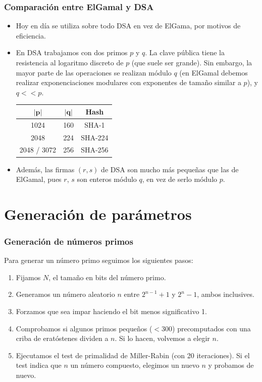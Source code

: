 \documentclass{beamer}
\begin{document}
\begin{frame}
    \frametitle{Comparación entre ElGamal y DSA}

    \begin{itemize}
        \item Hoy en día se utiliza sobre todo DSA en vez de ElGama, por motivos de eficiencia.
        \item En DSA trabajamos con dos primos $p$ y $q$. La clave pública tiene la resistencia al logaritmo discreto de $p$ (que suele ser grande). Sin embargo, la mayor parte de las operaciones se realizan módulo $q$ (en ElGamal debemos realizar exponenciaciones modulares con exponentes de tamaño similar a $p$), y $q << p$. \\
        
        \begin{table}[]
            \begin{tabular}{ccc} \toprule
                {$\mathbf{\vert p \vert}$} & {$\mathbf{|q|}$} & {\textbf{Hash}} \\ \hline
                1024 & 160 & SHA-1 \\
                2048 & 224 & SHA-224 \\
                2048 / 3072 & 256 & SHA-256 \\ \bottomrule
            \end{tabular}
        \end{table}
        \item Además, las firmas $(r, s)$ de DSA son mucho más pequeñas que las de ElGamal, pues $r$, $s$ son enteros módulo $q$, en vez de serlo módulo $p$.
    \end{itemize}
\end{frame}

\section {Generación de parámetros}

\begin{frame}
    
    \frametitle{Generación de números primos}

    Para generar un número primo seguimos los siguientes pasos:
    \begin{enumerate}
        \item Fijamos $N$, el tamaño en bits del número primo.
        \item Generamos un número aleatorio $n$ entre $2^{n-1}+1$ y $2^{n}-1$, ambos inclusives.
        \item Forzamos que sea impar haciendo el bit menos significativo 1.
        \item Comprobamos si algunos primos pequeños ($<300$) precomputados con una criba de eratóstenes dividen a $n$. Si lo hacen, volvemos a elegir $n$.
        \item Ejecutamos el test de primalidad de Miller-Rabin (con 20 iteraciones). Si el test indica que $n$ un número compuesto, elegimos un nuevo $n$ y probamos de nuevo.
    \end{enumerate}

\end{frame}
\end{document}
